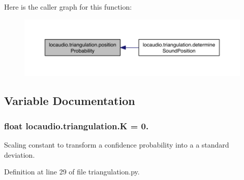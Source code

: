 Here is the caller graph for this function\-:\nopagebreak
\begin{figure}[H]
\begin{center}
\leavevmode
\includegraphics[width=350pt]{namespacelocaudio_1_1triangulation_af708227f069b847392f730d13060cce8_icgraph}
\end{center}
\end{figure}




\subsection{Variable Documentation}
\hypertarget{namespacelocaudio_1_1triangulation_ac85bcbed961d15baa586ddc0192860bb}{
\subsubsection[{K}]{\setlength{\rightskip}{0pt plus 5cm}float locaudio.\-triangulation.\-K = 0.}}\label{namespacelocaudio_1_1triangulation_ac85bcbed961d15baa586ddc0192860bb}


Scaling constant to transform a confidence probability into a a standard deviation. 



Definition at line 29 of file triangulation.\-py.

